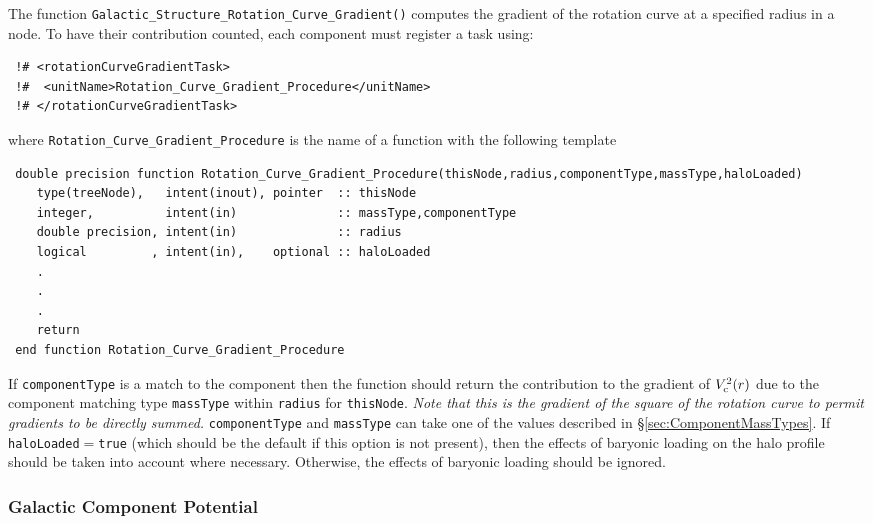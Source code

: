 The function {\tt Galactic\_Structure\_Rotation\_Curve\_Gradient()} computes the gradient of the rotation curve at a specified radius in a node. To have their contribution counted, each component must register a task using:
\begin{verbatim}
 !# <rotationCurveGradientTask>
 !#  <unitName>Rotation_Curve_Gradient_Procedure</unitName>
 !# </rotationCurveGradientTask>
\end{verbatim}
where {\tt Rotation\_Curve\_Gradient\_Procedure} is the name of a function with the following template
\begin{verbatim}
 double precision function Rotation_Curve_Gradient_Procedure(thisNode,radius,componentType,massType,haloLoaded)
    type(treeNode),   intent(inout), pointer  :: thisNode
    integer,          intent(in)              :: massType,componentType
    double precision, intent(in)              :: radius
    logical         , intent(in),    optional :: haloLoaded
    .
    .
    .
    return
 end function Rotation_Curve_Gradient_Procedure
\end{verbatim}
If {\tt componentType} is a match to the component then the function should return the contribution to the gradient of $V_{\rm c}^2(r)$ due to the component matching type {\tt massType} within {\tt radius} for {\tt thisNode}. \emph{Note that this is the gradient of the square of the rotation curve to permit gradients to be directly summed.} {\tt componentType} and {\tt massType} can take one of the values described in \S\ref{sec:ComponentMassTypes}. If {\tt haloLoaded}$=${\tt true} (which should be the default if this option is not present), then the effects of baryonic loading on the halo profile should be taken into account where necessary. Otherwise, the effects of baryonic loading should be ignored.

\subsubsection{Galactic Component Potential}

